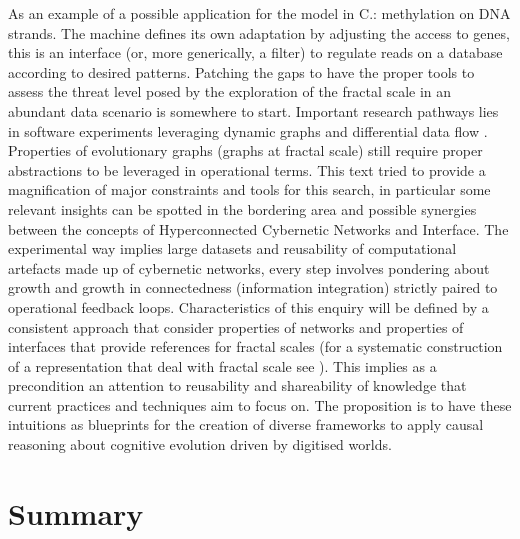 \documentclass[14pt,a4paper]{extarticle}
\begin{document}
As an example of a possible application for the model in C.: methylation on DNA strands. The machine defines its own adaptation by adjusting the access to genes, this is an interface (or, more generically, a filter) to regulate reads on a database according to desired patterns.
\newline
Patching the gaps to have the proper tools to assess the threat level posed by the exploration of the fractal scale in an abundant data scenario is somewhere to start. Important research pathways lies in software experiments leveraging dynamic graphs \cite{CS166dyngraphs} and differential data flow \cite{ABADIdiffdataflow}. Properties of evolutionary graphs (graphs at fractal scale) still require proper abstractions to be leveraged in operational terms. This text tried to provide a magnification of major constraints and tools for this search, in particular some relevant insights can be spotted in the bordering area and possible synergies between the concepts of Hyperconnected Cybernetic Networks and Interface. The experimental way implies large datasets and reusability of computational artefacts made up of cybernetic networks, every step involves pondering about growth and growth in connectedness (information integration) strictly paired to operational feedback loops. Characteristics of this enquiry will be defined by a consistent approach that consider properties of networks and properties of interfaces that provide references for fractal scales (for a systematic construction of a representation that deal with fractal scale see \cite{Wolfram2020}). This implies as a precondition an attention to reusability and shareability of knowledge that current practices and techniques aim to focus on. The proposition is to have these intuitions as blueprints for the creation of diverse frameworks to apply causal reasoning about cognitive evolution driven by digitised worlds.

\section*{Summary}
\label{subsec:summary}
\end{document}
